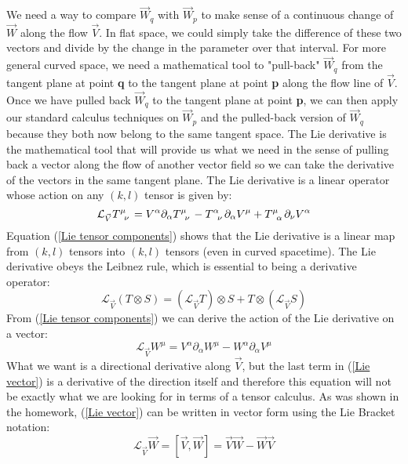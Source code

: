 \documentclass[10pt]{article}
\begin{document}
We need a way to compare $\vec W_q$ with $\vec W_p$ to make sense of a continuous change of $\vec W$ along the flow $\vec V$.  In flat space, we could simply take the difference of these two vectors and divide by the change in the parameter over that interval.  For more general curved space, we need a mathematical tool to "pull-back" $\vec W_q$ from the tangent plane at point \textbf{{\small q}} to the tangent plane at point \textbf{{\small p}} along the flow line of $\vec V$. Once we have pulled back $\vec W_q$ to the tangent plane at point \textbf{{\small p}}, we can then apply our standard calculus techniques on $\vec W_p$ and the pulled-back version of $\vec W_q$ because they both now belong to the same tangent space. The Lie derivative is the mathematical tool that will provide us what we need in the sense of pulling back a vector along the flow of another vector field so we can take the derivative of the vectors in the same tangent plane. 
The Lie derivative is a linear operator whose action on any $(k,l)$ tensor is given by:
\begin{equation}
\label{Lie tensor components}
   \mathcal{L}_{\vec V} \tensor {T}{^\mu_\nu} = V^\alpha \partial_\alpha \tensor{T}{^\mu_\nu} - \tensor {T}{^\alpha_\nu} \partial_\alpha V^\mu +\tensor{T}{^\mu_\alpha} \partial_\nu V^\alpha
\end{equation}
Equation (\ref{Lie tensor components}) shows that the Lie derivative is a linear map from $(k,l)$ tensors into $(k,l)$ tensors (even in curved spacetime). The Lie derivative obeys the Leibnez rule, which is essential to being a derivative operator:
\begin{equation}
\label{Leibnez Rule}
   \mathcal{L}_{\vec V} (T\otimes S) =(\mathcal{L}_{\vec V} T)\otimes S+T\otimes (\mathcal{L}_{\vec V} S)
\end{equation}
From (\ref{Lie tensor components}) we can derive the action of the Lie derivative on a vector:
\begin{equation}
\label{Lie vector}
   \mathcal{L}_{\vec V} W^\mu = V^\alpha \partial_\alpha W^\mu - W^\alpha \partial_\alpha V^\mu
\end{equation}
What we want is a directional derivative along $\vec V$, but the last term in (\ref{Lie vector}) is a derivative of the direction itself and therefore this equation will not be exactly what we are looking for in terms of a tensor calculus. As was shown in the homework, (\ref{Lie vector}) can be written in vector form using the Lie Bracket notation:
\begin{equation}
\label{Lie bracket}
   \mathcal{L}_{\vec V} \vec W = [\vec V,\vec W]=\vec V \vec W - \vec W \vec V
\end{equation}
\end{document}
